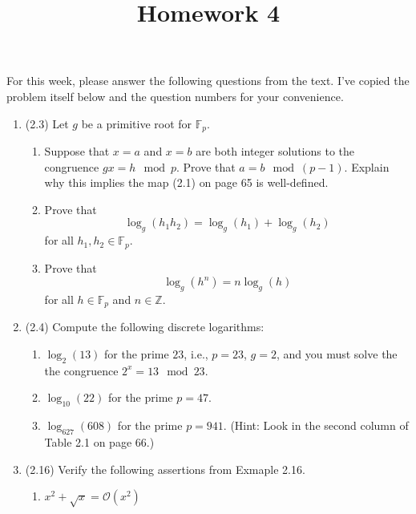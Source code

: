 \documentclass[12pt]{amsart}
\theoremstyle{definition}
\begin{document}
\title{Homework 4}

\maketitle

For this week, please answer the following questions from the text. 
I've copied the problem itself below and the question numbers for 
your convenience. 

\begin{enumerate}
	\item (2.3) Let $g$ be a primitive root for $\mathbb{F}_p$.
	\begin{enumerate}
		\item Suppose that $x=a$ and $x=b$ are both integer solutions to the congruence 
			$gx = h \mod p$. Prove that $a = b \mod (p-1)$. Explain why this implies 
			the map (2.1) on page 65 is well-defined. 
		\item Prove that 
		\begin{displaymath}
			\log_g(h_1 h_2) = \log_g(h_1) + \log_g(h_2) 
		\end{displaymath}
		for all $h_1,h_2 \in \mathbb{F}_p$.
		\item Prove that 
		\begin{displaymath}
			\log_g(h^n) = n\log_g(h) 
		\end{displaymath}
		for all $h \in \mathbb{F}_p$ and $n \in \mathbb{Z}$.
	\end{enumerate}
\item (2.4) Compute the following discrete logarithms:
\begin{enumerate}
\item $\log_2(13)$ for the prime $23$, i.e., $p=23$, $g=2$, and you must solve the the 
	congruence $2^x = 13 \mod 23$. 
\item $\log_{10}(22)$ for the prime $p=47$. 
\item $\log_627(608)$ for the prime $p=941$. (Hint: Look in the second column of Table 2.1 on page 66.) 
\end{enumerate}
\item (2.16) Verify the following assertions from Exmaple 2.16. 
	\begin{enumerate}
		\item $x^2 + \sqrt{x} = \mathcal O(x^2)$

\end{enumerate}
\end{enumerate}
\end{document}
